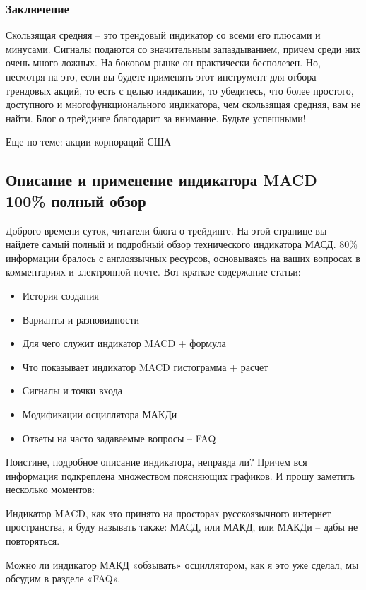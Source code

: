 \documentclass[a5paper]{article}
\begin{document}
\subsubsection{Заключение}

Скользящая средняя – это трендовый индикатор со всеми его плюсами и минусами. Сигналы подаются со значительным запаздыванием, причем среди них очень много ложных. На боковом рынке он практически бесполезен. Но, несмотря на это, если вы будете применять этот инструмент для отбора трендовых акций, то есть с целью индикации, то убедитесь, что более простого, доступного и многофункционального индикатора, чем скользящая средняя, вам не найти. Блог о трейдинге благодарит за внимание. Будьте успешными!


Еще по теме: акции корпораций США

\subsection{Описание и применение индикатора MACD – 100\% полный обзор}

Доброго времени суток, читатели блога о трейдинге. На этой странице вы найдете самый полный и подробный обзор технического индикатора МАСД. 80\% информации бралось с англоязычных ресурсов, основываясь на ваших вопросах в комментариях и электронной почте. Вот краткое содержание статьи:
\begin{itemize}
\item         История создания
\item         Варианты и разновидности
\item         Для чего служит индикатор MACD + формула
\item         Что показывает индикатор MACD гистограмма + расчет
\item         Сигналы и точки входа
\item         Модификации осциллятора МАКДи
\item         Ответы на часто задаваемые вопросы – FAQ
\end{itemize}

Поистине, подробное описание индикатора, неправда ли? Причем вся информация подкреплена множеством поясняющих графиков. И прошу заметить несколько моментов:

    Индикатор MACD, как это принято на просторах русскоязычного интернет пространства, я буду называть также: МАСД, или МАКД, или МАКДи – дабы не повторяться.

Можно ли индикатор МАКД «обзывать» осциллятором, как я это уже сделал, мы обсудим в разделе «FAQ».
\end{document}
